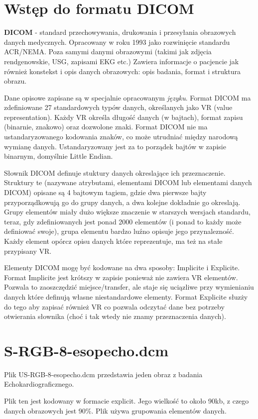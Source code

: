 \documentclass[11pt,a4paper]{article}
\begin{document}
\section{Wstęp do formatu DICOM}

\textbf{DICOM} - standard przechowywania, drukowania i przesyłania obrazowych danych
medycznych. Opracowany w roku 1993 jako rozwinięcie standardu ACR/NEMA. Poza
samymi danymi obrazowymi (takimi jak zdjęcia rendgenowskie, USG, zapisami EKG
etc.) Zawiera informacje o pacjencie jak również konstekst i opis danych
obrazowych: opis badania, format i struktura obrazu.

Dane opisowe zapisane są w specjalnie opracowanym \emph{języku}. Format DICOM
ma zdefiniowane 27 standardowych typów danych, określanych jako VR (value
representation). Każdy VR określa długość danych (w bajtach), format zapisu
(binarnie, znakowo) oraz dozwolone znaki. Format DICOM nie ma ustandaryzowanego
kodowania znaków, co może utrudniać między narodową wymianę danych.
Ustandaryzowany jest za to porządek bajtów w zapisie binarnym, domyślnie
Little Endian.

Słownik DICOM definuje stuktury danych okreslające ich przeznaczenie. Struktury
te (nazywane atrybutami, elementami DICOM lub elementami danych DICOM) opisane
są 4 bajtowym tagiem, gdzie dwa pierwsze bajty przyporządkowują go do grupy
danych, a dwa kolejne dokładnie go okreslają. Grupy elementów miały dużo
większe znaczenie w starszych wersjach standardu, teraz, gdy zdefiniowanych
jest ponad 2000 elementów (i ponad to każdy może definiować swoje), grupa
elementu bardzo luźno opisuje jego przynalezność. Każdy element opórcz opisu
danych które reprezentuje, ma też na stałe przypisany VR.

Elementy DICOM mogę być kodowane na dwa sposoby: Implicite i Explicite. Format
Implicite jest krótszy w zapisie ponieważ nie zawiera VR elementów. Pozwala to
zaoszczędzić miejsce/transfer, ale staje się uciązliwe przy wymienianiu danych
które definują własne niestandardowe elementy. Format Explicite słuzży do tego
aby zapisać również VR co pozwala odczytać dane bez potrzeby otwierania
słownika (choć i tak wtedy nie znamy przeznaczenia danych).

\section{S-RGB-8-esopecho.dcm}
Plik US-RGB-8-esopecho.dcm przedstawia jeden obraz z badania Echokardiograficznego.

Plik ten jest kodowany w formacie explicit. Jego wielkość to około 90kb, z
czego danych obrazowych jest 90\%. Plik używa grupowania elementów danych.
\end{document}
